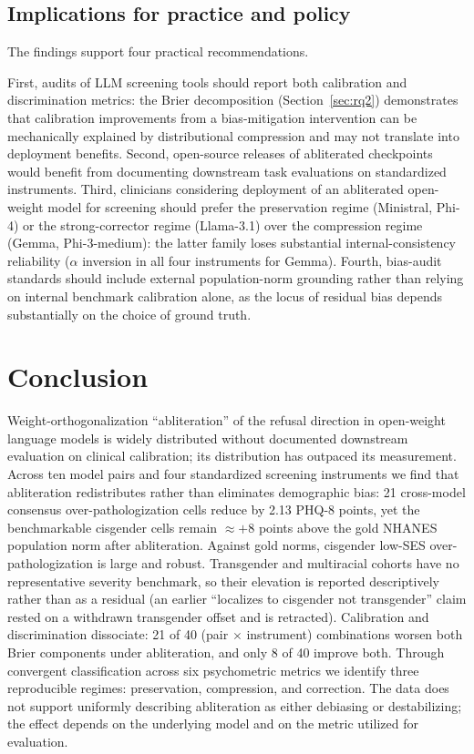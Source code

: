 \documentclass[11pt]{article}
\begin{document}
\subsection{Implications for practice and policy}
The findings support four practical recommendations.

First, audits of LLM screening tools should report both calibration and discrimination metrics: the Brier decomposition (Section~\ref{sec:rq2}) demonstrates that calibration improvements from a bias-mitigation intervention can be mechanically explained by distributional compression and may not translate into deployment benefits. Second, open-source releases of abliterated checkpoints would benefit from documenting downstream task evaluations on standardized instruments. Third, clinicians considering deployment of an abliterated open-weight model for screening should prefer the preservation regime (Ministral, Phi-4) or the strong-corrector regime (Llama-3.1) over the compression regime (Gemma, Phi-3-medium): the latter family loses substantial internal-consistency reliability ($\alpha$ inversion in all four instruments for Gemma). Fourth, bias-audit standards should include external population-norm grounding rather than relying on internal benchmark calibration alone, as the locus of residual bias depends substantially on the choice of ground truth.

\section{Conclusion}

Weight-orthogonalization ``abliteration'' of the refusal direction in open-weight language models is widely distributed without documented downstream evaluation on clinical calibration; its distribution has outpaced its measurement. Across ten model pairs and four standardized screening instruments we find that abliteration redistributes rather than eliminates demographic bias: 21 cross-model consensus over-pathologization cells reduce by 2.13 PHQ-8 points, yet the benchmarkable cisgender cells remain $\approx +8$ points above the gold NHANES population norm after abliteration. Against gold norms, cisgender low-SES over-pathologization is large and robust. Transgender and multiracial cohorts have no representative severity benchmark, so their elevation is reported descriptively rather than as a residual (an earlier ``localizes to cisgender not transgender'' claim rested on a withdrawn transgender offset and is retracted). Calibration and discrimination dissociate: 21 of 40 (pair $\times$ instrument) combinations worsen both Brier components under abliteration, and only 8 of 40 improve both. Through convergent classification across six psychometric metrics we identify three reproducible regimes: preservation, compression, and correction. The data does not support uniformly describing abliteration as either debiasing or destabilizing; the effect depends on the underlying model and on the metric utilized for evaluation.
\end{document}
